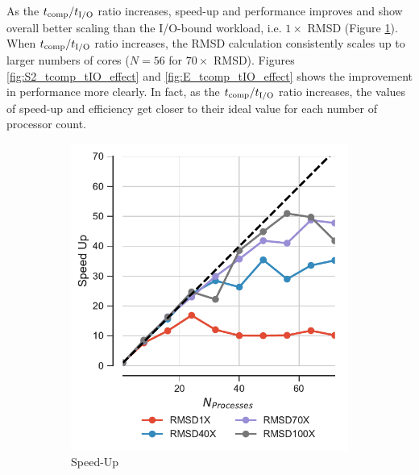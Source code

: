 As the ${t}_{\text{comp}}/{t}_{\text{I/O}}$ ratio increases, speed-up and performance improves and 
show overall better scaling than the I/O-bound workload, i.e. $1\times$ RMSD (Figure \ref{fig:S1_tcomp_tIO_effect}).
When ${t}_{\text{comp}}/{t}_{\text{I/O}}$ ratio increases, the RMSD calculation consistently scales up to larger numbers of cores ($N=56$ for $70\times$ RMSD).
Figures \ref{fig:S2_tcomp_tIO_effect} and \ref{fig:E_tcomp_tIO_effect} shows the improvement in performance more clearly.
In fact, as the ${t}_{\text{comp}}/{t}_{\text{I/O}}$ ratio increases, the values of speed-up and efficiency get closer to their ideal value for each number of processor count.  

\begin{figure}[ht!]
\centering
\begin{subfigure} {.3\textwidth}
  \includegraphics[width=\linewidth]{figures/Compute_to_IO_ratio_on_performance_2d_v17.pdf}
  \caption{Speed-Up}
  \label{fig:S1_tcomp_tIO_effect}
\end{subfigure}
\hfill
\begin{subfigure}{.3\textwidth}

\end{subfigure}
\end{figure}
